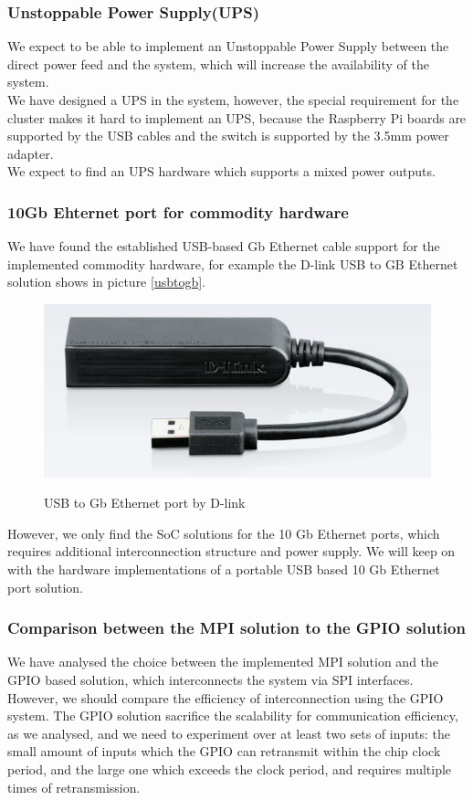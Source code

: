 \documentclass[11pt,openright,a4paper]{report}
\begin{document}
\subsubsection{Unstoppable Power Supply(UPS)}
We expect to be able to implement an Unstoppable Power Supply between the direct power feed and the system, which will increase the availability of the system.\\
We have designed a UPS in the system, however, the special requirement for the cluster makes it hard to implement an UPS, because the Raspberry Pi boards are supported by the USB cables and the switch is supported by the 3.5mm power adapter.\\
We expect to find an UPS hardware which supports a mixed power outputs.\\
\subsubsection{10Gb Ehternet port for commodity hardware}
We have found the established USB-based Gb Ethernet cable support for the implemented commodity hardware, for example the D-link USB to GB Ethernet solution shows in picture \ref{usbtogb}.\\
\begin{figure}[H]
	\centering
	\includegraphics[width=0.5\linewidth]{picture/usbtogb.jpg}
	\caption{USB to Gb Ethernet port by D-link}\cite{dlink}
	\label{fig:usbtogb}
\end{figure}
However, we only find the SoC solutions for the 10 Gb Ethernet ports, which requires additional interconnection structure and power supply. We will keep on with the hardware implementations of a portable USB based 10 Gb Ethernet port solution.\\
\subsubsection{Comparison between the MPI solution to the GPIO solution}
We have analysed the choice between the implemented MPI solution and the GPIO based solution, which interconnects the system via SPI interfaces. However, we should compare the efficiency of interconnection using the GPIO system. The GPIO solution sacrifice the scalability for communication efficiency, as we analysed, and we need to experiment over at least two sets of inputs: the small amount of inputs which the GPIO can retransmit within the chip clock period, and the large one which exceeds the clock period, and requires multiple times of retransmission.\\
\end{document}

